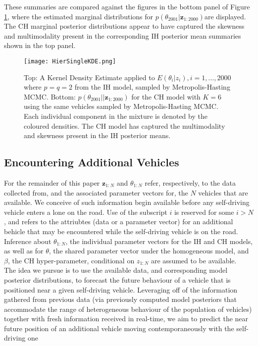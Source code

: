 \documentclass[12pt,a4paper]{article}\usepackage[]{graphicx}\usepackage[]{color}
\begin{document}
These summaries are compared against the figures in the bottom panel of Figure \ref{fig:HierSingleKDE}, where the estimated marginal distributions for $p(\theta_{2001} | \textbf{z}_{1:2000})$are displayed. The CH marginal posterior distributions appear to have captured the skewness and multimodality present in the corresponding IH posterior mean summaries shown in the top panel. 
\begin{figure}[ht]
\centering
\texttt{[image: HierSingleKDE.png]}
\caption{Top: A Kernel Density Estimate applied to $E(\theta_i | z_i), i = 1, \dots, 2000$ where $p = q = 2$ from the IH model, sampled by Metropolis-Hasting MCMC. Bottom: $p(\theta_{2001}| | \textbf{z}_{1:2000})$ for the CH model with $K = 6$ using the same vehicles sampled by Metropolis-Hasting MCMC. Each individual component in the mixture is denoted by the coloured densities. The CH model has captured the multimodality and skewness present in the IH posterior means.}
\label{fig:HierSingleKDE}
\end{figure}

\subsection{Encountering Additional Vehicles}
\label{subsec:additionalVehicles}

For the remainder of this paper $\textbf{z}_{1:N}$ and $\theta_{1:N}$ refer, respectively, to the data collected from, and the associated parameter vectors for, the $N$ vehicles that are available. We conceive of such information begin available before any self-driving vehicle enters a lone on the road. Use of the subscript $i$ is reserved for some $i > N$, and refers to the attriubtes (data or a parameter vector) for an additional behicle that may be encountered while the self-driving vehicle is on the road. Inference about $\theta_{1:N}$, the individual parameter vectors for the IH and CH models, as well as for $\theta$, the shared parameter vector under the homogeneous model, and $\beta$, the CH hyper-parameter, conditional on $z_{1:N}$ are assumed to be available.
\\

The idea we pursue is to use the available data, and corresponding model posterior distributions, to forecast the future behaviour of a vehicle that is positioned near a given self-driving vehicle. Leveraging off of the information gathered from previous data (via previously computed model posteriors that accommodate the range of heterogeneous behaviour of the population of vehicles) together with fresh information received in real-time, we aim to predict the near future position of an additional vehicle moving contemporaneously with the self-driving one
\\
\end{document}
